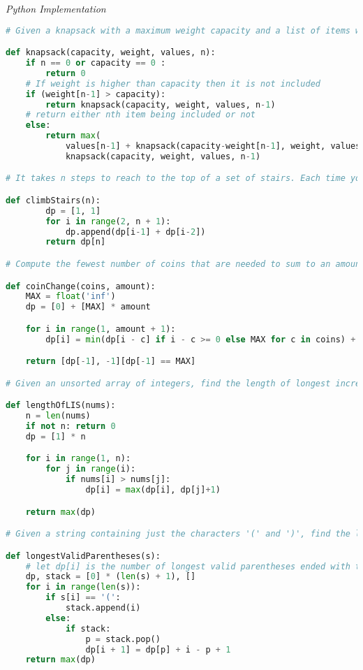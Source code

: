 \documentclass{article}
\begin{document}
\vspace{8pt} \emph{Python Implementation}
\begin{lstlisting}[language=Python]
# Given a knapsack with a maximum weight capacity and a list of items with value and weights, maximize the amount of value we can fit within the knapsacks weight capacity.

def knapsack(capacity, weight, values, n):
    if n == 0 or capacity == 0 :
        return 0
    # If weight is higher than capacity then it is not included
    if (weight[n-1] > capacity):
        return knapsack(capacity, weight, values, n-1)
    # return either nth item being included or not
    else:
        return max(
            values[n-1] + knapsack(capacity-weight[n-1], weight, values, n-1),
            knapsack(capacity, weight, values, n-1)

# It takes n steps to reach to the top of a set of stairs. Each time you can either climb 1 or 2 steps. In how many distinct ways can you climb to the top?

def climbStairs(n):
        dp = [1, 1]
        for i in range(2, n + 1):
            dp.append(dp[i-1] + dp[i-2])
        return dp[n]

# Compute the fewest number of coins that are needed to sum to an amount

def coinChange(coins, amount):
    MAX = float('inf')
    dp = [0] + [MAX] * amount

    for i in range(1, amount + 1):
        dp[i] = min(dp[i - c] if i - c >= 0 else MAX for c in coins) + 1

    return [dp[-1], -1][dp[-1] == MAX]

# Given an unsorted array of integers, find the length of longest increasing subsequence.

def lengthOfLIS(nums):
    n = len(nums)
    if not n: return 0
    dp = [1] * n

    for i in range(1, n):
        for j in range(i):
            if nums[i] > nums[j]:
                dp[i] = max(dp[i], dp[j]+1)

    return max(dp)

# Given a string containing just the characters '(' and ')', find the length of the longest valid (well-formed) parentheses substring.

def longestValidParentheses(s):
    # let dp[i] is the number of longest valid parentheses ended with the i - 1 position of s,
    dp, stack = [0] * (len(s) + 1), []
    for i in range(len(s)):
        if s[i] == '(':
            stack.append(i)
        else:
            if stack:
                p = stack.pop()
                dp[i + 1] = dp[p] + i - p + 1
    return max(dp)
\end{lstlisting}
\end{document}
